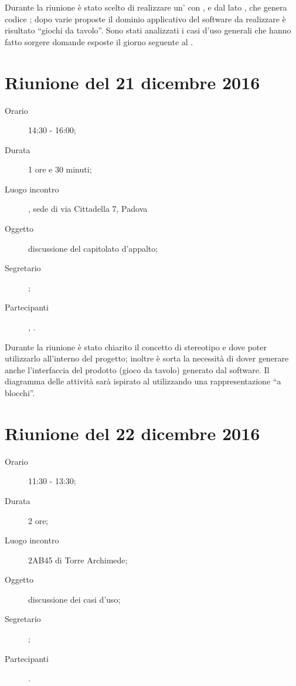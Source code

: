 Durante la riunione è stato scelto di realizzare un' con ,  e  dal lato , che genera codice ; dopo varie proposte il dominio applicativo del software da realizzare è risultato “giochi da tavolo”. 
Sono stati analizzati i casi d'uso generali che hanno fatto sorgere domande esposte il giorno seguente al \GP.



\section{Riunione del 21 dicembre 2016}

\begin{description}
	\item[Orario] 14:30 - 16:00;
	\item[Durata] 1 ore e 30 minuti;
	\item[Luogo incontro] \ZU, sede di via Cittadella 7, Padova
	\item[Oggetto] discussione del capitolato d'appalto;
	\item[Segretario] \AZ; 
	\item[Partecipanti] \GP, \ALL.
\end{description}

Durante la riunione è stato chiarito il concetto di stereotipo e dove poter utilizzarlo all'interno del progetto; inoltre è sorta la necessità di dover generare anche l'interfaccia del prodotto (gioco da tavolo) generato dal software. Il diagramma delle attività sarà ispirato al  utilizzando una rappresentazione “a blocchi”.



\section{Riunione del 22 dicembre 2016}

\begin{description}
	\item[Orario] 11:30 - 13:30;
	\item[Durata] 2 ore;
	\item[Luogo incontro] 2AB45 di Torre Archimede;
	\item[Oggetto] discussione dei casi d'uso;
	\item[Segretario] \PB; 
	\item[Partecipanti] \ALL.
\end{description}


